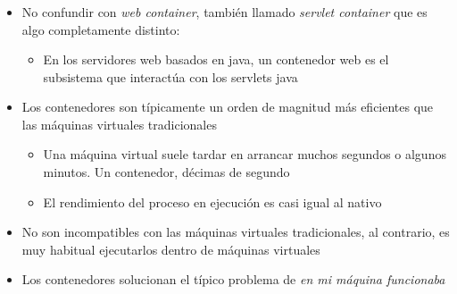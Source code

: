 \documentclass[ucs]{beamer}
\begin{document}
\begin{frame}[fragile]
\frametitle{}
\begin{itemize}
\item
No confundir con  \emph{web container}, 
también llamado \emph{servlet container}
que es algo completamente distinto: 

\begin{itemize}
\item
En los servidores web basados en java,
un contenedor web  
es el subsistema que interactúa con los servlets java
\end{itemize}


\item
Los contenedores son típicamente un orden de magnitud más eficientes que las máquinas virtuales tradicionales

\begin{itemize}
\item
Una máquina virtual suele tardar en arrancar muchos segundos o algunos minutos. Un contenedor,
décimas de segundo
\item
El rendimiento del proceso en ejecución es casi igual al nativo
\end{itemize}

\item
No son incompatibles con las máquinas virtuales tradicionales, al contrario, es muy habitual
ejecutarlos dentro de máquinas virtuales

\item

Los contenedores solucionan el típico problema de \emph{en mi máquina funcionaba}

\end{itemize}
\end{frame}
\end{document}
